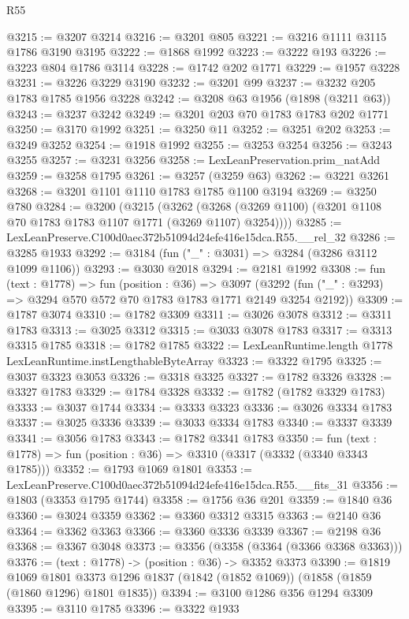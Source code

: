 \begin{lexlean}{R55}
\begin{coremodule}
@3215 := @3207 @3214
@3216 := @3201 @805
@3221 := @3216 @1111 @3115 @1786 @3190 @3195
@3222 := @1868 @1992
@3223 := @3222 @193
@3226 := @3223 @804 @1786 @3114
@3228 := @1742 @202 @1771
@3229 := @1957 @3228
@3231 := @3226 @3229 @3190
@3232 := @3201 @99
@3237 := @3232 @205 @1783 @1785 @1956 @3228
@3242 := @3208 @63 @1956 (@1898 (@3211 @63))
@3243 := @3237 @3242
@3249 := @3201 @203 @70 @1783 @1783 @202 @1771
@3250 := @3170 @1992
@3251 := @3250 @11
@3252 := @3251 @202
@3253 := @3249 @3252
@3254 := @1918 @1992
@3255 := @3253 @3254
@3256 := @3243 @3255
@3257 := @3231 @3256
@3258 := LexLeanPreservation.prim_natAdd
@3259 := @3258 @1795
@3261 := @3257 (@3259 @63)
@3262 := @3221 @3261
@3268 := @3201 @1101 @1110 @1783 @1785 @1100 @3194
@3269 := @3250 @780
@3284 := @3200
    (@3215
      (@3262 (@3268 (@3269 @1100) (@3201 @1108 @70 @1783 @1783 @1107 @1771 (@3269 @1107) @3254))))
@3285 := LexLeanPreserve.C100d0aec372b51094d24efe416e15dca.R55.__rel_32
@3286 := @3285 @1933
@3292 := @3184 (fun ("_" : @3031) => @3284 (@3286 @3112 @1099 @1106))
@3293 := @3030 @2018
@3294 := @2181 @1992
@3308 := fun (text : @1778) =>
  fun (position : @36) =>
  @3097 (@3292 (fun ("_" : @3293) => @3294 @570 @572 @70 @1783 @1783 @1771 @2149 @3254 @2192))
@3309 := @1787 @3074
@3310 := @1782 @3309
@3311 := @3026 @3078
@3312 := @3311 @1783
@3313 := @3025 @3312
@3315 := @3033 @3078 @1783
@3317 := @3313 @3315 @1785
@3318 := @1782 @1785
@3322 := LexLeanRuntime.length @1778 LexLeanRuntime.instLengthableByteArray
@3323 := @3322 @1795
@3325 := @3037 @3323 @3053
@3326 := @3318 @3325
@3327 := @1782 @3326
@3328 := @3327 @1783
@3329 := @1784 @3328
@3332 := @1782 (@1782 @3329 @1783)
@3333 := @3037 @1744
@3334 := @3333 @3323
@3336 := @3026 @3334 @1783
@3337 := @3025 @3336
@3339 := @3033 @3334 @1783
@3340 := @3337 @3339
@3341 := @3056 @1783
@3343 := @1782 @3341 @1783
@3350 := fun (text : @1778) => fun (position : @36) => @3310 (@3317 (@3332 (@3340 @3343 @1785)))
@3352 := @1793 @1069 @1801
@3353 := LexLeanPreserve.C100d0aec372b51094d24efe416e15dca.R55.__fits_31
@3356 := @1803 (@3353 @1795 @1744)
@3358 := @1756 @36 @201
@3359 := @1840 @36
@3360 := @3024 @3359
@3362 := @3360 @3312 @3315
@3363 := @2140 @36
@3364 := @3362 @3363
@3366 := @3360 @3336 @3339
@3367 := @2198 @36
@3368 := @3367 @3048
@3373 := @3356 (@3358 (@3364 (@3366 @3368 @3363)))
@3376 := (text : @1778) -> (position : @36) -> @3352 @3373
@3390 := @1819
    @1069
    @1801
    @3373
    @1296
    @1837
    (@1842 (@1852 @1069))
    (@1858 (@1859 (@1860 @1296) @1801 @1835))
@3394 := @3100 @1286 @356 @1294 @3309
@3395 := @3110 @1785
@3396 := @3322 @1933

\end{coremodule}
\end{lexlean}

